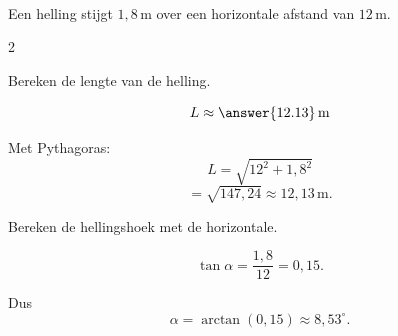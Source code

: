 \documentclass{ximera}
\begin{document}
    \begin{oefening}{\oefU\ESS}
    \\
    
    Een helling stijgt $1{,}8\,\mathrm m$ over een horizontale afstand van $12\,\mathrm m$.
    
    \begin{center}
    \end{center}
    
    \begin{multicols}{2}
    
    \begin{question}
    Bereken de lengte van de helling.
    
    \[
    L\approx\answer{12.13}\,\mathrm m
    \]
    
    \begin{oplossing}
    Met Pythagoras:
    \[
    L=\sqrt{12^2+1{,}8^2}
    \]
    \[
    =\sqrt{147{,}24}
    \approx12{,}13\,\mathrm m.
    \]
    \end{oplossing}
    \end{question}
    
    
    \begin{question}
    Bereken de hellingshoek met de horizontale.
    
    \begin{oplossing}
    \[
    \tan\alpha
    =\frac{1{,}8}{12}
    =0{,}15.
    \]
    
    Dus
    \[
    \alpha
    =\arctan(0{,}15)
    \approx8{,}53^\circ.
    \]
    \end{oplossing}
    \end{question}
    

\end{multicols}
\end{oefening}
\end{document}
